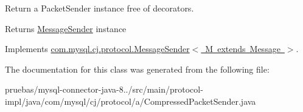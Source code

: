 Return a Packet\+Sender instance free of decorators.

\begin{DoxyReturn}{Returns}
\mbox{\hyperlink{interfacecom_1_1mysql_1_1cj_1_1protocol_1_1_message_sender}{Message\+Sender}} instance 
\end{DoxyReturn}


Implements \mbox{\hyperlink{interfacecom_1_1mysql_1_1cj_1_1protocol_1_1_message_sender_a8066931f03c2fa9cc705716fa10a4517}{com.\+mysql.\+cj.\+protocol.\+Message\+Sender$<$ M extends Message $>$}}.



The documentation for this class was generated from the following file\+:\begin{DoxyCompactItemize}
\item 
pruebas/mysql-\/connector-\/java-\/8../src/main/protocol-\/impl/java/com/mysql/cj/protocol/a/Compressed\+Packet\+Sender.\+java\end{DoxyCompactItemize}

